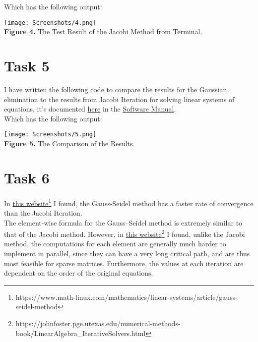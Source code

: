 \documentclass{article}
\begin{document}


Which has the following output:
\begin{center}
\texttt{[image: Screenshots/4.png]}\\
{\bf Figure 4.} The Test Result of the Jacobi Method from Terminal.
\end{center}

\section*{Task 5}
I have written the following code to compare the results for the Gaussian elimination to the results from Jacobi Iteration for solving linear systems of equations, it's documented \href{https://github.com/GoByMark/math4610/blob/main/Homework_Tasks/Tasksheet_09/src/Task_5.py}{here} in the \href{https://github.com/GoByMark/math4610/blob/main/Homework_Tasks/Software_Manual/Software_Manual_toc.md}{Software Manual}.\\



Which has the following output:
\begin{center}
\texttt{[image: Screenshots/5.png]}\\
{\bf Figure 5.} The Comparison of the Results.
\end{center}

\section*{Task 6}
In \href{https://www.math-linux.com/mathematics/linear-systems/article/gauss-seidel-method}{this website}\footnote{https://www.math-linux.com/mathematics/linear-systems/article/gauss-seidel-method} I found, the Gauss-Seidel method has a faster rate of convergence than the Jacobi Iteration. \\

The element-wise formula for the Gauss–Seidel method is extremely similar to that of the Jacobi method. However, in \href{https://johnfoster.pge.utexas.edu/numerical-methods-book/LinearAlgebra_IterativeSolvers.html}{this website}\footnote{https://johnfoster.pge.utexas.edu/numerical-methods-book/LinearAlgebra\_IterativeSolvers.html} I found,  unlike the Jacobi method, the computations for each element are generally much harder to implement in parallel, since they can have a very long critical path, and are thus most feasible for sparse matrices. Furthermore, the values at each iteration are dependent on the order of the original equations.
\end{document}

